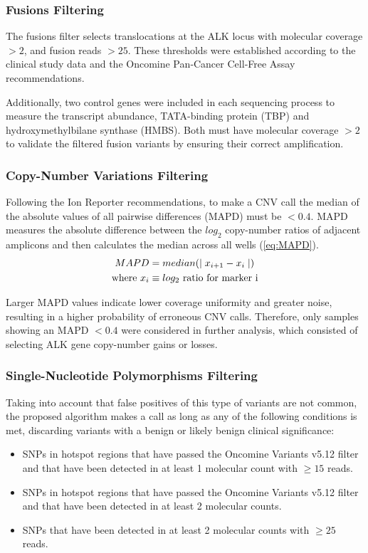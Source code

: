 \subsubsection{Fusions Filtering}

The fusions filter selects translocations at the ALK locus with molecular coverage $> 2$, and fusion reads $> 25$. These thresholds were established according to the clinical study data and the Oncomine\texttrademark{} Pan‐Cancer Cell‐Free Assay recommendations.

Additionally, two control genes were included in each sequencing process to measure the transcript abundance, TATA-binding protein (TBP) and hydroxymethylbilane synthase (HMBS). Both must have molecular coverage $> 2$ to validate the filtered fusion variants by ensuring their correct amplification.

\subsubsection{Copy-Number Variations Filtering}

Following the Ion Reporter\texttrademark{} recommendations, to make a CNV call the median of the absolute values of all pairwise differences (MAPD) must be $< 0.4$. MAPD measures the absolute difference between the $log_2$ copy-number ratios of adjacent amplicons and then calculates the median across all wells (\autoref{eq:MAPD}).
\begin{align} \label{eq:MAPD}
    MAPD &= median(\mid x_{i+1}-x_i \mid) \\
    \text{where}~
    x_i &\equiv \text{$log_2$ ratio for marker i} \notag
\end{align}

Larger MAPD values indicate lower coverage uniformity and greater noise, resulting in a higher probability of erroneous CNV calls. Therefore, only samples showing an MAPD $< 0.4$ were considered in further analysis, which consisted of selecting ALK gene copy-number gains or losses.

\subsubsection{Single-Nucleotide Polymorphisms Filtering}

Taking into account that false positives of this type of variants are not common, the proposed algorithm makes a call as long as any of the following conditions is met, discarding variants with a benign or likely benign clinical significance:
\begin{itemize}
    \item SNPs in hotspot regions that have passed the Oncomine\texttrademark{} Variants v5.12 filter and that have been detected in at least 1 molecular count with $\ge 15$ reads.
    \item SNPs in hotspot regions that have passed the Oncomine\texttrademark{} Variants v5.12 filter and that have been detected in at least 2 molecular counts.
    \item SNPs that have been detected in at least 2 molecular counts with $\ge 25$ reads.
\end{itemize}

